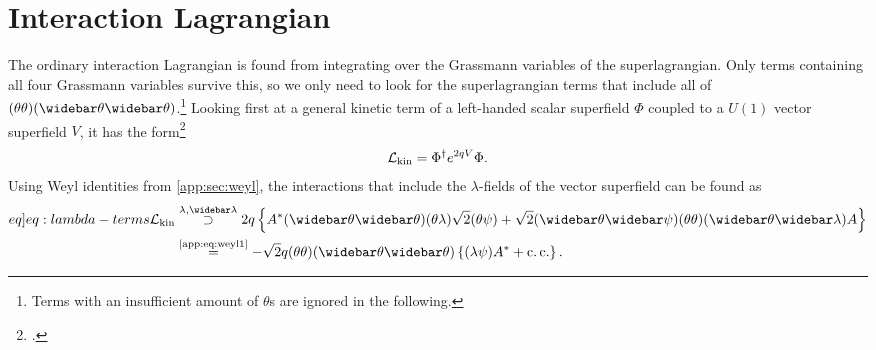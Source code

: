 \documentclass[english, notitlepage]{article}
\begin{document}
\section{Interaction Lagrangian}
    The ordinary interaction Lagrangian is found from integrating over the
    Grassmann variables of the superlagrangian.
    Only terms containing all four Grassmann variables survive this, so we only need to look for the superlagrangian terms that include all of $(\theta\theta)(\wbar\theta\wbar\theta)$.\footnote{Terms with an insufficient amount of $\theta$s are ignored in the following.}
    Looking first at a general kinetic term of a left-handed scalar superfield \(\Phi\) coupled to a $U(1)$ vector superfield \(V\), it has the form\footcite{Binetruy:2006ad}
    \begin{align}
        {\mathcal{L}}_\text{kin} = \Phi^\dag e^{2qV} \Phi.
    \end{align}
    Using Weyl identities from \cref{app:sec:weyl}, the interactions that include the $\lambda$-fields of the vector superfield can be found as
    \begin{align}
        \label[eq]{eq:lambda-terms}
        \nonumber
        \msub{\L}{kin} & \stackrel{\lambda, \wbar\lambda}{\supset} 2q\cclosed{ A^* (\wbar\theta\wbar\theta)(\theta\lambda) \sqrt{2} (\theta\psi) + \sqrt{2} (\wbar\theta\wbar\psi) (\theta\theta)(\wbar\theta\wbar\lambda) A } \\
                       & \stackrel{\text{\cref{app:eq:weyl1}}}{=} -\sqrt{2}q (\theta\theta)(\wbar\theta\wbar\theta) \cclosed{ (\lambda\psi)A^* + \cc }.
    \end{align}
\end{document}
